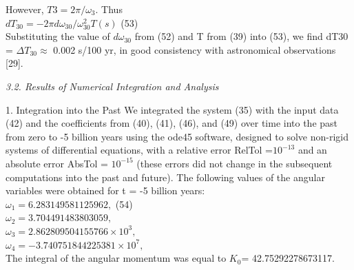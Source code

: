 \documentclass[fontsize = 11pt,a4paper]{article}
\begin{document}
\begin{multicols}{2}
However, $T3 = 2 \pi / \omega_3$. Thus \\
$dT_{30} = - 2 \pi d \omega_{30} / \omega^2_{30}T(s)$  \hfill (53)\\
Substituting the value of $d\omega_{30}$ from (52) and T from
(39) into (53), we find dT30 = $\Delta T_{30} \approx $ 0.002 s/100 yr,
in good consistency with astronomical observations
[29].\\
 \centerline{\emph{3.2. Results of Numerical Integration and Analysis}}
1. Integration into the Past We integrated the system
(35) with the input data (42) and the coefficients
from (40), (41), (46), and (49) over time into the past
from zero to -5 billion years using the ode45 software,
designed to solve non-rigid systems of differential
equations, with a relative error RelTol =$ {10}^{-13}$
and an absolute error AbsTol = ${10}^{-15}$ (these errors
did not change in the subsequent computations into
the past and future). The following values of the angular
variables were obtained for t = -5 billion years:\\
$\omega_1 =6.283149581125962,$ \hfill (54)\\
$\omega_2 =3.704491483803059,$ \\
$\omega_3 =2.862809504155766 \times {10}^3,$\\
$\omega_4 =-3.740751844225381 \times {10}^7,$\\
The integral of the angular momentum was equal to
$K_0 $= 42.75292278673117.\\
\end{multicols}
\end{document}
